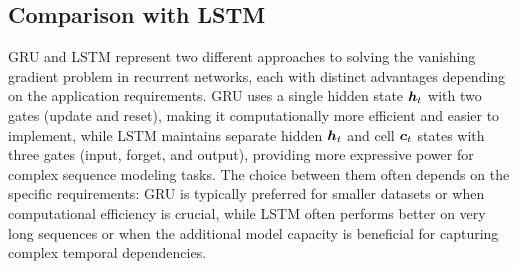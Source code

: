 \subsection{Comparison with LSTM}

GRU and LSTM represent two different approaches to solving the vanishing gradient problem in recurrent networks, each with distinct advantages depending on the application requirements. GRU uses a single hidden state $\boldsymbol{h}_t$ with two gates (update and reset), making it computationally more efficient and easier to implement, while LSTM maintains separate hidden $\boldsymbol{h}_t$ and cell $\boldsymbol{c}_t$ states with three gates (input, forget, and output), providing more expressive power for complex sequence modeling tasks. The choice between them often depends on the specific requirements: GRU is typically preferred for smaller datasets or when computational efficiency is crucial, while LSTM often performs better on very long sequences or when the additional model capacity is beneficial for capturing complex temporal dependencies.

